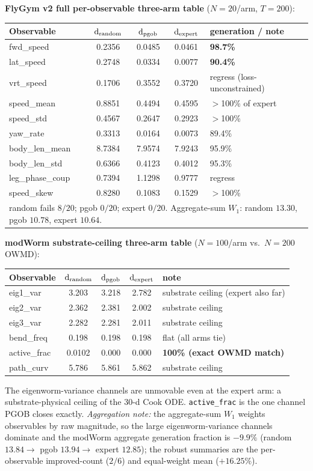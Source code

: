 \documentclass[11pt]{article}
\begin{document}
\textbf{FlyGym v2 full per-observable three-arm table} ($N{=}20$/arm, $T{=}200$):
\begin{longtable}{lcccl}\toprule
Observable & $\mathrm{d}_{\rm random}$ & $\mathrm{d}_{\rm pgob}$ & $\mathrm{d}_{\rm expert}$ & generation / note \\\midrule\endhead
fwd\_speed   & 0.2356 & 0.0485 & 0.0461 & \textbf{98.7\%} \\
lat\_speed   & 0.2748 & 0.0334 & 0.0077 & \textbf{90.4\%} \\
vrt\_speed   & 0.1706 & 0.3552 & 0.3720 & regress (loss-unconstrained) \\
speed\_mean  & 0.8851 & 0.4494 & 0.4595 & $>$100\% of expert \\
speed\_std   & 0.4567 & 0.2647 & 0.2923 & $>$100\% \\
yaw\_rate    & 0.3313 & 0.0164 & 0.0073 & 89.4\% \\
body\_len\_mean & 8.7384 & 7.9574 & 7.9243 & 95.9\% \\
body\_len\_std  & 0.6366 & 0.4123 & 0.4012 & 95.3\% \\
leg\_phase\_coup & 0.7394 & 1.1298 & 0.9777 & regress \\
speed\_skew  & 0.8280 & 0.1083 & 0.1529 & $>$100\% \\\midrule
\multicolumn{5}{l}{random fails $8/20$; pgob $0/20$; expert $0/20$. Aggregate-sum $W_1$: random $13.30$, pgob $10.78$, expert $10.64$.} \\\bottomrule
\end{longtable}

\textbf{modWorm substrate-ceiling three-arm table} ($N{=}100$/arm vs.\ $N{=}200$ OWMD):
\begin{center}\small
\begin{tabular}{lcccl}\toprule
Observable & $\mathrm{d}_{\rm random}$ & $\mathrm{d}_{\rm pgob}$ & $\mathrm{d}_{\rm expert}$ & note \\\midrule
eig1\_var & 3.203 & 3.218 & 2.782 & substrate ceiling (expert also far) \\
eig2\_var & 2.362 & 2.381 & 2.002 & substrate ceiling \\
eig3\_var & 2.282 & 2.281 & 2.011 & substrate ceiling \\
bend\_freq & 0.198 & 0.198 & 0.198 & flat (all arms tie) \\
active\_frac & 0.0102 & 0.000 & 0.000 & \textbf{100\% (exact OWMD match)} \\
path\_curv & 5.786 & 5.861 & 5.862 & substrate ceiling \\\bottomrule
\end{tabular}
\end{center}
The eigenworm-variance channels are unmovable even at the expert arm: a substrate-physical ceiling of the 30-d Cook ODE. \texttt{active\_frac} is the one channel PGOB closes exactly. \emph{Aggregation note:} the aggregate-sum $W_1$ weights observables by raw magnitude, so the large eigenworm-variance channels dominate and the modWorm aggregate generation fraction is $-9.9\%$ (random $13.84\to$ pgob $13.94\to$ expert $12.85$); the robust summaries are the per-observable improved-count ($2/6$) and equal-weight mean ($+16.25\%$).
\end{document}
